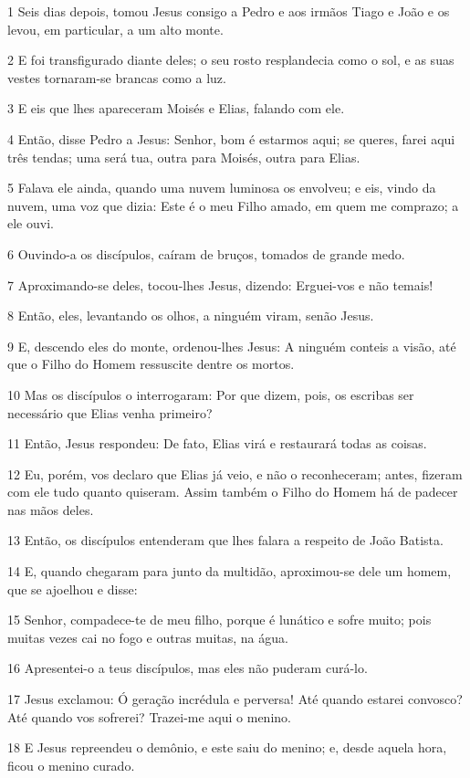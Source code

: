\par 1 Seis dias depois, tomou Jesus consigo a Pedro e aos irmãos Tiago e João e os levou, em particular, a um alto monte.
\par 2 E foi transfigurado diante deles; o seu rosto resplandecia como o sol, e as suas vestes tornaram-se brancas como a luz.
\par 3 E eis que lhes apareceram Moisés e Elias, falando com ele.
\par 4 Então, disse Pedro a Jesus: Senhor, bom é estarmos aqui; se queres, farei aqui três tendas; uma será tua, outra para Moisés, outra para Elias.
\par 5 Falava ele ainda, quando uma nuvem luminosa os envolveu; e eis, vindo da nuvem, uma voz que dizia: Este é o meu Filho amado, em quem me comprazo; a ele ouvi.
\par 6 Ouvindo-a os discípulos, caíram de bruços, tomados de grande medo.
\par 7 Aproximando-se deles, tocou-lhes Jesus, dizendo: Erguei-vos e não temais!
\par 8 Então, eles, levantando os olhos, a ninguém viram, senão Jesus.
\par 9 E, descendo eles do monte, ordenou-lhes Jesus: A ninguém conteis a visão, até que o Filho do Homem ressuscite dentre os mortos.
\par 10 Mas os discípulos o interrogaram: Por que dizem, pois, os escribas ser necessário que Elias venha primeiro?
\par 11 Então, Jesus respondeu: De fato, Elias virá e restaurará todas as coisas.
\par 12 Eu, porém, vos declaro que Elias já veio, e não o reconheceram; antes, fizeram com ele tudo quanto quiseram. Assim também o Filho do Homem há de padecer nas mãos deles.
\par 13 Então, os discípulos entenderam que lhes falara a respeito de João Batista.
\par 14 E, quando chegaram para junto da multidão, aproximou-se dele um homem, que se ajoelhou e disse:
\par 15 Senhor, compadece-te de meu filho, porque é lunático e sofre muito; pois muitas vezes cai no fogo e outras muitas, na água.
\par 16 Apresentei-o a teus discípulos, mas eles não puderam curá-lo.
\par 17 Jesus exclamou: Ó geração incrédula e perversa! Até quando estarei convosco? Até quando vos sofrerei? Trazei-me aqui o menino.
\par 18 E Jesus repreendeu o demônio, e este saiu do menino; e, desde aquela hora, ficou o menino curado.
